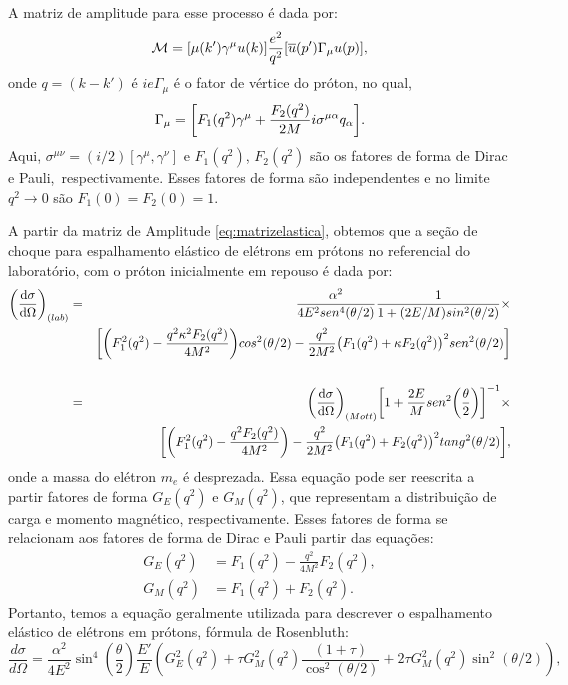 A matriz de amplitude para esse processo é dada por:
\begin{equation}
    \mathcal{M} = \qty[\mu (k')\gamma^\mu u(k)] \frac{e^2}{q^2} \qty[\overline{u}(p')\Gamma_\mu u(p)],
    \label{eq:matrizelastica}
\end{equation}
onde $q=(k-k')$ é $ie\Gamma_\mu$ é o fator de vértice do próton, no qual,
\begin{equation}
    \Gamma_\mu = \qty[F_1(q^2)\gamma^\mu + \frac{F_2(q^2)}{2M}i \sigma^{\mu \alpha}q_\alpha ].
\end{equation}
Aqui, $\sigma^{\mu\nu} = (i/2)[\gamma^\mu, \gamma^\nu]$ e $F_1(q^2)$, $F_2(q^2)$ são os fatores de forma de Dirac e Pauli,~respectivamente. Esses fatores de forma são independentes e no limite  $q^2\rightarrow 0$ são $F_1(0)=F_2(0)=1$.

A partir da matriz de Amplitude \eqref{eq:matrizelastica},  obtemos que a seção de choque para  espalhamento elástico de elétrons em prótons no referencial do laboratório, com o próton inicialmente em repouso é dada por:
\begin{eqnarray}
    \qty(\dv{\sigma}{\Omega})_{(lab)}&=&\frac{\alpha^2 }{4 E^2 sen^4 (\theta/2)} \frac{1}{1+(2E/M)sin^2(\theta/2)}\times\nonumber\\&&\qty[\qty(F_1^2(q^2) - \frac{q^2 \kappa^2F_2(q^2)}{4M^2})cos^2\qty(\theta/2) - \frac{q^2}{2M^2}\qty(F_1(q^2) + \kappa F_2(q^2))^2 sen^2\qty(\theta/2)]
    \nonumber\\\nonumber\\
    &=&\qty(\dv{\sigma}{\Omega})_{(Mott)}\qty[1+\frac{2E}{M}sen^2 \qty(\frac{\theta}{2})]^{-1}\times\nonumber\\&&\qty[\qty(F_1^2(q^2) - \frac{q^2 F_2(q^2)}{4M^2}) - \frac{q^2}{2M^2}\qty(F_1(q^2) + F_2(q^2))^2 tang^2\qty(\theta/2)],
\end{eqnarray}
onde a massa do elétron $m_e$ é desprezada. Essa equação pode ser reescrita a partir fatores de forma $G_E(q^2)$ e $G_M(q^2)$, que representam a distribuição de carga e momento magnético, respectivamente. Esses fatores de forma se relacionam aos fatores de forma de Dirac e Pauli partir das equações:
\begin{align}
    G_E(q^2) & = F_1(q^2) - \frac{q^2}{4M^2}F_2(q^2), \\
    G_M(q^2) & = F_1(q^2) + F_2(q^2).
\end{align}
Portanto, temos a equação geralmente utilizada para descrever o espalhamento elástico de elétrons em prótons,  fórmula de Rosenbluth:
\begin{equation}
    \frac{d\sigma}{d\Omega} = \frac{\alpha^2}{4E^2}\sin^4\left(\frac{\theta}{2}\right)\frac{E'}{E}\left(G_E^2(q^2) + \tau G_M^2(q^2)\frac{(1 + \tau)}{\cos^2(\theta/2)} + 2\tau G_M^2(q^2)\sin^2(\theta/2)\right),
    \label{eq:rosenbluth}
\end{equation}
